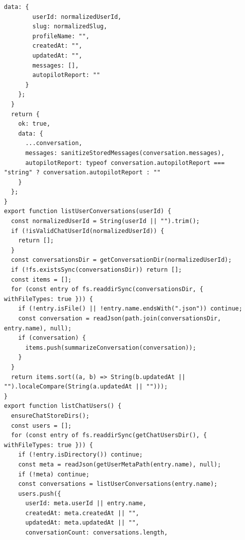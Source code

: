 \documentclass[12pt,a4paper]{article}
\begin{document}
\begin{Verbatim}[fontsize=\footnotesize]
      data: {
        userId: normalizedUserId,
        slug: normalizedSlug,
        profileName: "",
        createdAt: "",
        updatedAt: "",
        messages: [],
        autopilotReport: ""
      }
    };
  }
  return {
    ok: true,
    data: {
      ...conversation,
      messages: sanitizeStoredMessages(conversation.messages),
      autopilotReport: typeof conversation.autopilotReport === "string" ? conversation.autopilotReport : ""
    }
  };
}
export function listUserConversations(userId) {
  const normalizedUserId = String(userId || "").trim();
  if (!isValidChatUserId(normalizedUserId)) {
    return [];
  }
  const conversationsDir = getConversationDir(normalizedUserId);
  if (!fs.existsSync(conversationsDir)) return [];
  const items = [];
  for (const entry of fs.readdirSync(conversationsDir, { withFileTypes: true })) {
    if (!entry.isFile() || !entry.name.endsWith(".json")) continue;
    const conversation = readJson(path.join(conversationsDir, entry.name), null);
    if (conversation) {
      items.push(summarizeConversation(conversation));
    }
  }
  return items.sort((a, b) => String(b.updatedAt || "").localeCompare(String(a.updatedAt || "")));
}
export function listChatUsers() {
  ensureChatStoreDirs();
  const users = [];
  for (const entry of fs.readdirSync(getChatUsersDir(), { withFileTypes: true })) {
    if (!entry.isDirectory()) continue;
    const meta = readJson(getUserMetaPath(entry.name), null);
    if (!meta) continue;
    const conversations = listUserConversations(entry.name);
    users.push({
      userId: meta.userId || entry.name,
      createdAt: meta.createdAt || "",
      updatedAt: meta.updatedAt || "",
      conversationCount: conversations.length,
\end{Verbatim}
\newpage
{}
\fancyhead[R]{}
\end{document}
